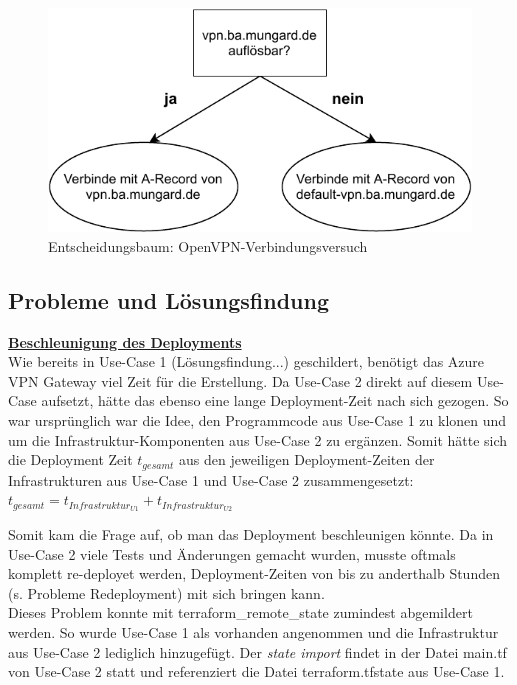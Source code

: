 \begin{figure}[h]
  \centering
  \includegraphics{Figures/entscheidungsbaum_openvpn_config.pdf}
  \caption{Entscheidungsbaum: OpenVPN-Verbindungsversuch}
  \label{grafik:Use-Case_2_Entscheidungsbaum_OpenVPN}
\end{figure}\FloatBarrier




\subsection{Probleme und Lösungsfindung}



\textbf{\underline{Beschleunigung des Deployments}}\\
Wie bereits in Use-Case 1 (Lösungsfindung...) geschildert, benötigt das Azure VPN Gateway viel Zeit für die Erstellung. Da Use-Case 2 direkt auf diesem Use-Case aufsetzt, hätte das ebenso eine lange Deployment-Zeit nach sich gezogen. So war ursprünglich war die Idee, den Programmcode aus Use-Case 1 zu klonen und um die Infrastruktur-Komponenten aus Use-Case 2 zu ergänzen. Somit hätte sich die Deployment Zeit $t_{gesamt}$ aus den jeweiligen Deployment-Zeiten der Infrastrukturen aus Use-Case 1 und Use-Case 2 zusammengesetzt:\\
$t_{gesamt} = t_{Infrastruktur_{U1}} + t_{Infrastruktur_{U2}}$

Somit kam die Frage auf, ob man das Deployment beschleunigen könnte. Da in Use-Case 2 viele Tests und Änderungen gemacht wurden, musste oftmals komplett re-deployet werden, Deployment-Zeiten von bis zu anderthalb Stunden (s. Probleme Redeployment) mit sich bringen kann.\\
Dieses Problem konnte mit terraform\_remote\_state zumindest abgemildert werden. So wurde Use-Case 1 als vorhanden angenommen und die Infrastruktur aus Use-Case 2 lediglich hinzugefügt. Der \textit{state import} findet in der Datei main.tf von Use-Case 2 statt und referenziert die Datei terraform.tfstate aus Use-Case 1.

